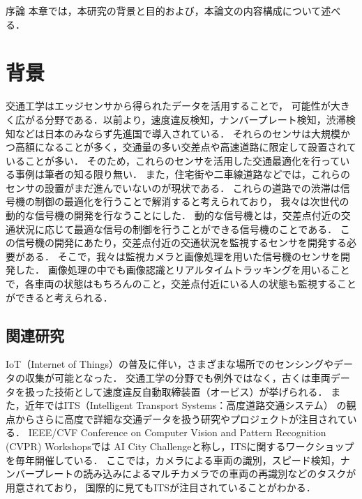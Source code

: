 \chapterhead
{序論}
{本章では，本研究の背景と目的および，本論文の内容構成について述べる．}

\section{背景}
交通工学はエッジセンサから得られたデータを活用することで，
可能性が大きく広がる分野である．以前より，速度違反検知，ナンバープレート検知，渋滞検知などは日本のみならず先進国で導入されている．
それらのセンサは大規模かつ高額になることが多く，交通量の多い交差点や高速道路に限定して設置されていることが多い．
そのため，これらのセンサを活用した交通最適化を行っている事例は筆者の知る限り無い．
また，住宅街や二車線道路などでは，これらのセンサの設置がまだ進んでいないのが現状である．
これらの道路での渋滞は信号機の制御の最適化を行うことで解消すると考えられており，
我々は次世代の動的な信号機の開発を行なうことにした．
動的な信号機とは，交差点付近の交通状況に応じて最適な信号の制御を行うことができる信号機のことである．
この信号機の開発にあたり，交差点付近の交通状況を監視するセンサを開発する必要がある．
そこで，我々は監視カメラと画像処理を用いた信号機のセンサを開発した．
画像処理の中でも画像認識とリアルタイムトラッキングを用いることで，各車両の状態はもちろんのこと，交差点付近にいる人の状態も監視することができると考えられる．%

\subsection{関連研究}
IoT（Internet of Things）の普及に伴い，さまざまな場所でのセンシングやデータの収集が可能となった．
交通工学の分野でも例外ではなく，古くは車両データを扱った技術として速度違反自動取締装置（オービス）が挙げられる．
また，近年ではITS（Intelligent Transport Systems：高度道路交通システム）
の観点からさらに高度で詳細な交通データを扱う研究やプロジェクトが注目されている．
IEEE/CVF Conference on Computer Vision and Pattern Recognition (CVPR) Workshopsでは
AI City Challenge\cite{Naphade_2020_CVPR_Workshops}と称し，ITSに関するワークショップを毎年開催している．
ここでは，カメラによる車両の識別，スピード検知，ナンバープレートの読み込みによるマルチカメラでの車両の再識別などのタスクが用意されており，
国際的に見てもITSが注目されていることがわかる．

